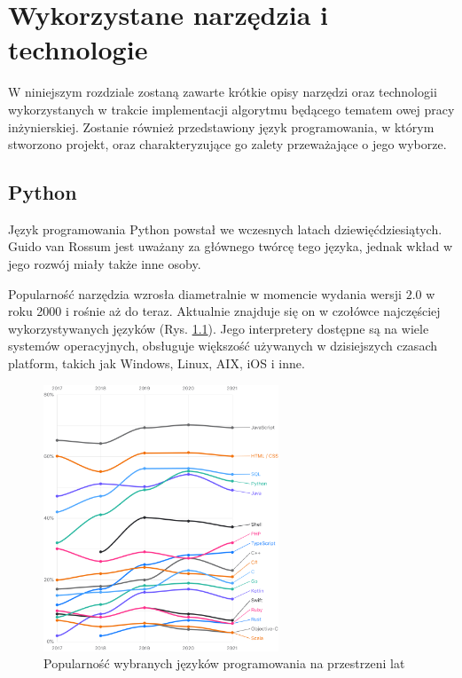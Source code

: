 \chapter{Wykorzystane narzędzia i technologie}
\label{cha:wykorzystaneNarzedziaITechnologie}
W niniejszym rozdziale zostaną zawarte krótkie opisy narzędzi oraz technologii wykorzystanych w trakcie implementacji algorytmu będącego tematem owej pracy inżynierskiej. Zostanie również przedstawiony język programowania, w którym stworzono projekt, oraz charakteryzujące go zalety przeważające o jego wyborze. 


\section{Python}
Język programowania Python \cite{PythonWiki} powstał we wczesnych latach dziewięćdziesiątych. Guido van Rossum jest uważany za głównego twórcę tego języka, jednak wkład w jego rozwój miały także inne osoby. 

Popularność narzędzia wzrosła diametralnie w momencie wydania wersji $2.0$ w roku 2000 i rośnie aż do teraz. Aktualnie znajduje się on w czołówce najczęściej wykorzystywanych języków (Rys. \ref{fig:programmingLang}). Jego interpretery dostępne są na wiele systemów operacyjnych, obsługuje większość używanych w dzisiejszych czasach platform, takich jak Windows, Linux, AIX, iOS i inne.

\begin{figure}[h]
	\centering
	\includegraphics[width=7cm]{zdjęcia/python.png}
	\caption{Popularność wybranych języków programowania na przestrzeni lat} 
	\label{fig:programmingLang}
\end{figure}

